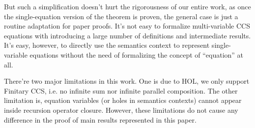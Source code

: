 But such a simplification doesn't hurt the rigorousness of our entire
work, as once the single-equation version of the theorem is
proven, the general case is just a routine
adaptation for paper proofs.
It's not easy to formalize multi-variable CCS equations with
introducing a large number of definitions and intermediate
results. It's easy, however, to directly use the semantics context to
represent single-variable equations without the need of formalizing
the concept of ``equation'' at all.

There're two major limitations in this work. One is due to HOL, we only support Finitary CCS, i.e.
no infinite sum nor infinite parallel composition.
The other limitation is, equation variables (or holes in semantics contexts)
cannot appear inside recursion operator closure. However, these limitations do not
cause any difference in the proof of main results represented in this paper.

